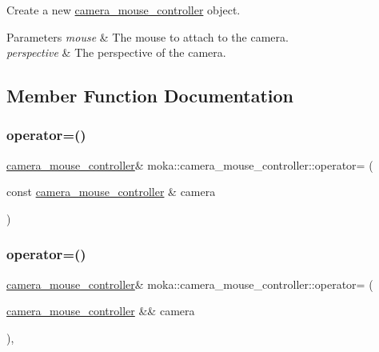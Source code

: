 Create a new \mbox{\hyperlink{classmoka_1_1camera__mouse__controller}{camera\+\_\+mouse\+\_\+controller}} object. 


\begin{DoxyParams}{Parameters}
{\em mouse} & The mouse to attach to the camera. \\
\hline
{\em perspective} & The perspective of the camera. \\
\hline
\end{DoxyParams}


\subsection{Member Function Documentation}
\mbox{\label{classmoka_1_1camera__mouse__controller_a510baecd761914c83b7330549dbb7197}} 
\subsubsection{\texorpdfstring{operator=()}{operator=()}\hspace{0.1cm}{\footnotesize\ttfamily [1/2]}}
{\footnotesize\ttfamily \mbox{\hyperlink{classmoka_1_1camera__mouse__controller}{camera\+\_\+mouse\+\_\+controller}}\& moka\+::camera\+\_\+mouse\+\_\+controller\+::operator= (\begin{DoxyParamCaption}\item[{const \mbox{\hyperlink{classmoka_1_1camera__mouse__controller}{camera\+\_\+mouse\+\_\+controller}} \&}]{camera }\end{DoxyParamCaption})\hspace{0.3cm}{\ttfamily [delete]}}

\mbox{\label{classmoka_1_1camera__mouse__controller_a5e016278de0bea6870520235fee70dba}} 
\subsubsection{\texorpdfstring{operator=()}{operator=()}\hspace{0.1cm}{\footnotesize\ttfamily [2/2]}}
{\footnotesize\ttfamily \mbox{\hyperlink{classmoka_1_1camera__mouse__controller}{camera\+\_\+mouse\+\_\+controller}}\& moka\+::camera\+\_\+mouse\+\_\+controller\+::operator= (\begin{DoxyParamCaption}\item[{\mbox{\hyperlink{classmoka_1_1camera__mouse__controller}{camera\+\_\+mouse\+\_\+controller}} \&\&}]{camera }\end{DoxyParamCaption})\hspace{0.3cm}{\ttfamily [delete]}, {\ttfamily [noexcept]}}

